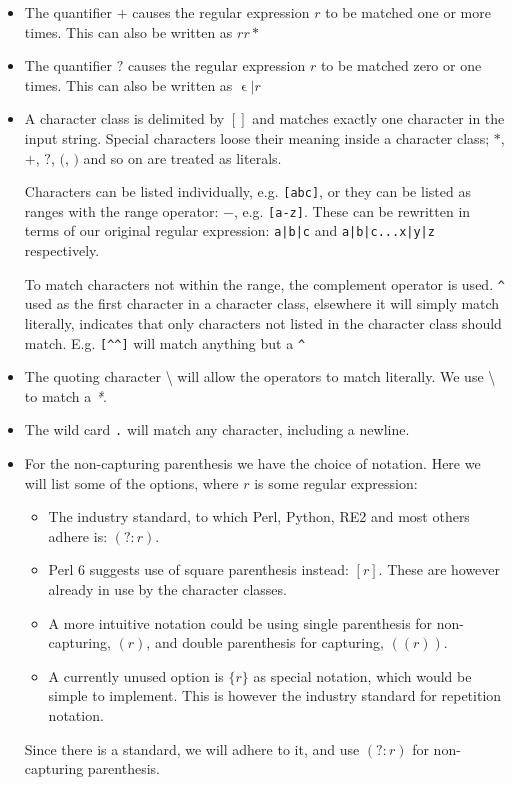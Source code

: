 \begin{itemize}
\item The quantifier $+$ causes the regular expression $r$ to be
  matched one or more times. This can also be written as $rr*$
\item The quantifier $?$ causes the regular expression $r$ to be
  matched zero or one times. This can also be written as
  $\upvarepsilon|r$
\item A character class is delimited by $[]$ and matches exactly one
  character in the input string. Special characters loose their
  meaning inside a character class; $*$, $+$, $?$, $($, $)$ and so on
  are treated as literals.

  Characters can be listed individually, e.g. \texttt{[abc]}, or they
  can be listed as ranges with the range operator: $-$,
  e.g. \texttt{[a-z]}. These can be rewritten in terms of our original
  regular expression: \texttt{a|b|c} and \texttt{a|b|c...x|y|z}
  respectively.

  To match characters not within the range, the complement operator is
  used. \texttt{\^{}} used as the first character in a character
  class, elsewhere it will simply match literally, indicates that only
  characters not listed in the character class should
  match. E.g. \texttt{[\^{}\^{}]} will match anything but a
  \texttt{\^{}}
\item The quoting character \textsf{\textbackslash} will allow the
  operators to match literally. We use \textsf{\textbackslash *} to
  match a \textsl{*}.
\item The wild card \texttt{.} will match any character, including a
  newline.
\item For the non-capturing parenthesis we have the choice of
  notation. Here we will list some of the options, where $r$ is some
  regular expression:
  \begin{itemize}
  \item The industry standard, to which Perl, Python, RE2 and most
    others adhere is: $(?:r)$.
  \item Perl 6 \cite{Wall2002} suggests use of square parenthesis instead:
    $[r]$. These are however already in use by the character classes.
  \item A more intuitive notation could be using single parenthesis
    for non-capturing, $(r)$, and double parenthesis for capturing,
    $((r))$.
  \item A currently unused option is $\{r\}$ as special notation, which would
  be simple to implement. This
    is however the industry standard for repetition notation.
  \end{itemize}
  
  Since there is a standard, we will adhere to it, and use $(?:r)$ for
  non-capturing parenthesis.
\end{itemize}

